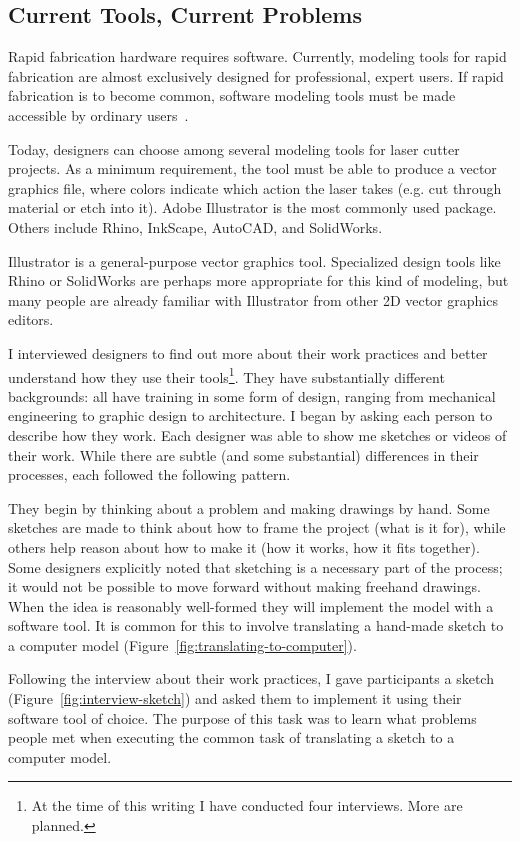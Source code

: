\documentclass[11pt]{article}
\begin{document}
\subsection{Current Tools, Current Problems}

Rapid fabrication hardware requires software. Currently, modeling
tools for rapid fabrication are almost exclusively designed for
professional, expert users. If rapid fabrication is to become common,
software modeling tools must be made accessible by ordinary
users~\cite{lipson-homefactory}.

Today, designers can choose among several modeling tools for laser
cutter projects. As a minimum requirement, the tool must be able to
produce a vector graphics file, where colors indicate which action the
laser takes (e.g. cut through material or etch into it). Adobe
Illustrator is the most commonly used package. Others include Rhino,
InkScape, AutoCAD, and SolidWorks.

Illustrator is a general-purpose vector graphics tool. Specialized
design tools like Rhino or SolidWorks are perhaps more appropriate for
this kind of modeling, but many people are already familiar with
Illustrator from other 2D vector graphics editors. 

I interviewed designers to find out more about their work practices
and better understand how they use their tools\footnote{At the time of
  this writing I have conducted four interviews. More are
  planned.}. They have substantially different backgrounds: all have
training in some form of design, ranging from mechanical engineering
to graphic design to architecture. I began by asking each person to
describe how they work. Each designer was able to show me sketches or
videos of their work. While there are subtle (and some substantial)
differences in their processes, each followed the following pattern.

They begin by thinking about a problem and making drawings by
hand. Some sketches are made to think about how to frame the project
(what is it for), while others help reason about how to make it (how
it works, how it fits together). Some designers explicitly noted that
sketching is a necessary part of the process; it would not be possible
to move forward without making freehand drawings. When the idea is
reasonably well-formed they will implement the model with a software
tool. It is common for this to involve translating a hand-made sketch
to a computer model (Figure~\ref{fig:translating-to-computer}). 

Following the interview about their work practices, I gave
participants a sketch (Figure~\ref{fig:interview-sketch}) and asked
them to implement it using their software tool of choice. The purpose
of this task was to learn what problems people met when executing the
common task of translating a sketch to a computer model.
\end{document}
